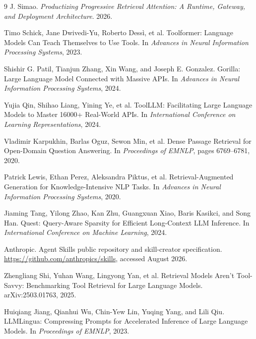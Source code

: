 \begin{thebibliography}{9}
J. Simao.
\newblock \emph{Productizing Progressive Retrieval Attention: A Runtime,
Gateway, and Deployment Architecture}. 2026.

Timo Schick, Jane Dwivedi-Yu, Roberto Dess\`i, et al.
\newblock Toolformer: Language Models Can Teach Themselves to Use Tools.
\newblock In \emph{Advances in Neural Information Processing Systems}, 2023.

Shishir G. Patil, Tianjun Zhang, Xin Wang, and Joseph E. Gonzalez.
\newblock Gorilla: Large Language Model Connected with Massive APIs.
\newblock In \emph{Advances in Neural Information Processing Systems}, 2024.

Yujia Qin, Shihao Liang, Yining Ye, et al.
\newblock ToolLLM: Facilitating Large Language Models to Master 16000+
Real-World APIs.
\newblock In \emph{International Conference on Learning Representations}, 2024.

Vladimir Karpukhin, Barlas Oguz, Sewon Min, et al.
\newblock Dense Passage Retrieval for Open-Domain Question Answering.
\newblock In \emph{Proceedings of EMNLP}, pages 6769--6781, 2020.

Patrick Lewis, Ethan Perez, Aleksandra Piktus, et al.
\newblock Retrieval-Augmented Generation for Knowledge-Intensive NLP Tasks.
\newblock In \emph{Advances in Neural Information Processing Systems}, 2020.

Jiaming Tang, Yilong Zhao, Kan Zhu, Guangxuan Xiao, Baris Kasikci, and Song Han.
\newblock Quest: Query-Aware Sparsity for Efficient Long-Context LLM Inference.
\newblock In \emph{International Conference on Machine Learning}, 2024.

Anthropic.
\newblock Agent Skills public repository and skill-creator specification.
\newblock \url{https://github.com/anthropics/skills}, accessed August 2026.

Zhengliang Shi, Yuhan Wang, Lingyong Yan, et al.
\newblock Retrieval Models Aren't Tool-Savvy: Benchmarking Tool Retrieval for
Large Language Models.
\newblock arXiv:2503.01763, 2025.

Huiqiang Jiang, Qianhui Wu, Chin-Yew Lin, Yuqing Yang, and Lili Qiu.
\newblock LLMLingua: Compressing Prompts for Accelerated Inference of Large
Language Models.
\newblock In \emph{Proceedings of EMNLP}, 2023.


\end{thebibliography}
